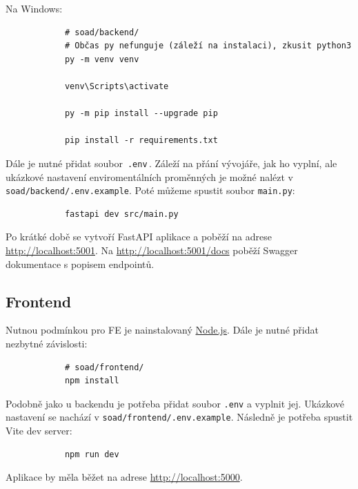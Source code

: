 \documentclass[12pt]{article}
\begin{document}
\begin{teamwork}
        Na Windows:

        \begin{verbatim}
            # soad/backend/
            # Občas py nefunguje (záleží na instalaci), zkusit python3
            py -m venv venv

            venv\Scripts\activate

            py -m pip install --upgrade pip

            pip install -r requirements.txt
        \end{verbatim}

        Dále je nutné přidat soubor \,\texttt{.env}\,.
        Záleží na přání vývojáře, jak ho vyplní, ale ukázkové nastavení enviromentálních
        proměnných je možné nalézt v \texttt{soad/backend/.env.example}.
        Poté můžeme spustit soubor \texttt{main.py}:

        \begin{verbatim}
            fastapi dev src/main.py
        \end{verbatim}

        Po krátké době se vytvoří FastAPI aplikace a poběží na adrese \href{http://localhost:5001}{http://localhost:5001}.
        Na \href{http://localhost:5001/docs}{http://localhost:5001/docs} poběží Swagger dokumentace s popisem endpointů.

        \subsection{Frontend}\label{subsec:frontend}

        Nutnou podmínkou pro FE je nainstalovaný \href{https://nodejs.org/en/download}{Node.js}.
        Dále je nutné přidat nezbytné závislosti:

        \begin{verbatim}
            # soad/frontend/
            npm install
        \end{verbatim}

        Podobně jako u backendu je potřeba přidat soubor \texttt{.env} a vyplnit jej.
        Ukázkové nastavení se nachází v
        \texttt{soad/frontend/.env.example}.
        Následně je potřeba spustit Vite dev server:

        \begin{verbatim}
            npm run dev
        \end{verbatim}

        Aplikace by měla běžet na adrese \href{http://localhost:5000}{http://localhost:5000}.


\end{teamwork}
\end{document}
